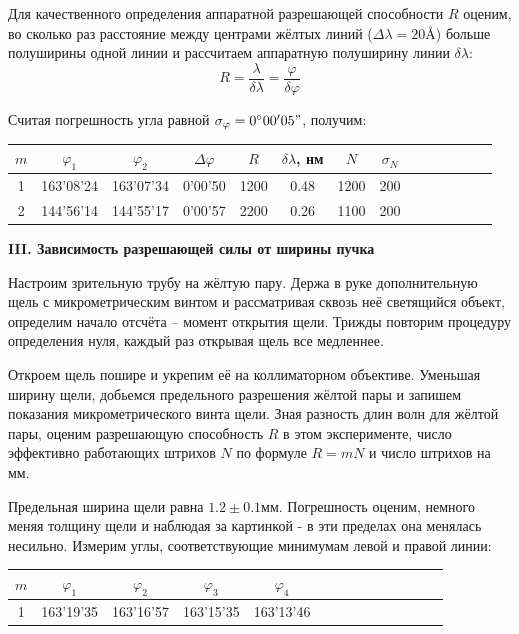 \documentclass[14pt]{article}
\begin{document}
Для качественного определения аппаратной разрешающей способности $R$ оценим, во сколько раз расстояние между центрами жёлтых линий ($\Delta\lambda = 20$\r{A}) больше полуширины одной линии и рассчитаем аппаратную полуширину линии $\delta\lambda$:
$$
	R = \frac{\lambda}{\delta\lambda} = \frac{\varphi}{\delta\varphi}
$$ 

Считая погрешность угла равной $\sigma_\varphi = 0^\circ00'05"$, получим:

\begin{center}
\begin{tabular}{|c|c|c|c|c|c|c|c|c|c|c|c|c|c|}
\hline
$m$	&	$\varphi_1$	&	$\varphi_2$	&	$\Delta\varphi$	&	$R$		&	$\delta\lambda$, нм		&	$N$		&	$\sigma_N$	\\
\hline
1	&	163'08'24	&	163'07'34	&	0'00'50			&	1200	&	0.48					&	1200	&	200			\\
\hline
2	&	144'56'14	&	144'55'17	&	0'00'57			&	2200	&	0.26					&	1100	&	200			\\
\hline
\end{tabular}
\end{center}

\vspace{1cm}
\textbf{III. Зависимость разрешающей силы от ширины пучка}

Настроим зрительную трубу на жёлтую пару. Держа в руке дополнительную щель с микрометрическим винтом и рассматривая сквозь неё светящийся объект, определим начало отсчёта -- момент открытия щели. Трижды повторим процедуру определения нуля, каждый раз открывая щель все медленнее.

Откроем щель пошире и укрепим её на коллиматорном объективе. Уменьшая ширину щели, добьемся предельного разрешения жёлтой пары и запишем показания микрометрического винта щели. Зная разность длин волн для жёлтой пары, оценим разрешающую способность $R$ в этом эксперименте, число эффективно работающих штрихов $N$ по формуле $R = mN$ и число штрихов на мм.

Предельная ширина щели равна $1.2\pm0.1$мм. Погрешность оценим, немного меняя толщину щели и наблюдая за картинкой - в эти пределах она менялась несильно. Измерим углы, соответствующие минимумам левой и правой линии:

\begin{center}
\begin{tabular}{|c|c|c|c|c|c|c|c|c|c|c|c|c|c|}
\hline
$m$	&	$\varphi_1$	&	$\varphi_2$	&	$\varphi_3$	&	$\varphi_4$	\\
\hline
1	&	163'19'35	&	163'16'57	&	163'15'35	&	163'13'46	\\
\hline
\end{tabular}
\end{center}
\end{document}
